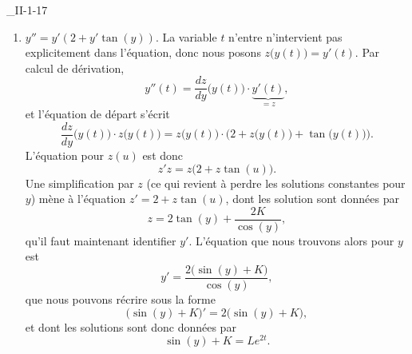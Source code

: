\begin{corrige}{_II-1-17}
\begin{enumerate}
\item
$y''=y'(2+y'\tan(y))$. La variable $t$ n'entre n'intervient pas explicitement dans l'équation, donc nous posons $z\big( y(t) \big)=y'(t)$. Par calcul de dérivation,
\begin{equation}
	y''(t)=\frac{ dz }{ dy }\big( y(t) \big)\cdot \underbrace{y'(t)}_{=z},
\end{equation}
et l'équation de départ s'écrit
\begin{equation}
	\frac{ dz }{ dy }\big( y(t) \big)\cdot z\big( y(t) \big)=z\big( y(t) \big)\cdot\Big( 2+z\big( y(t) \big)+\tan\big( y(t) \big) \Big).
\end{equation}
L'équation pour $z(u)$ est donc
\begin{equation}
	z'z=z\big( 2+z\tan(u) \big).
\end{equation}
Une simplification par $z$ (ce qui revient à perdre les solutions constantes pour $y$) mène à l'équation $z'=2+z\tan(u)$, dont les solution sont données par
\begin{equation}
	z=2\tan(y)+\frac{ 2K }{ \cos(y) },
\end{equation}
qu'il faut maintenant identifier $y'$. L'équation que nous trouvons alors pour $y$ est
\begin{equation}
	y'=\frac{ 2\big( \sin(y)+K \big) }{ \cos(y) },
\end{equation}
que nous pouvons récrire sous la forme
\begin{equation}
	\big( \sin(y)+K \big)'=2\big( \sin(y)+K \big),
\end{equation}
et dont les solutions sont donc données par
\begin{equation}
	\sin(y)+K=L e^{2t}.
\end{equation}


\end{enumerate}
\end{corrige}
